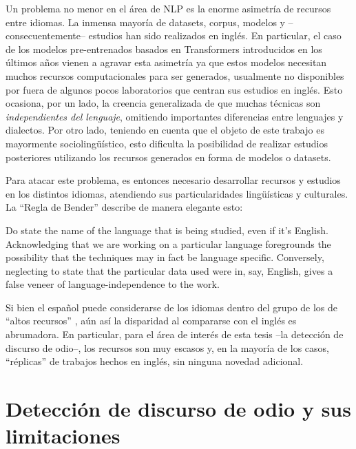 Un problema no menor en el área de NLP es la enorme asimetría de recursos entre idiomas. La inmensa mayoría de datasets, corpus, modelos y --consecuentemente-- estudios han sido realizados en inglés. En particular, el caso de los modelos pre-entrenados basados en Transformers introducidos en los últimos años vienen a agravar esta asimetría ya que estos modelos necesitan muchos recursos computacionales para ser generados, usualmente no disponibles por fuera de algunos pocos laboratorios que centran sus estudios en inglés. Esto ocasiona, por un lado, la creencia generalizada de que muchas técnicas son \emph{independientes del lenguaje}, omitiendo importantes diferencias entre lenguajes y dialectos. Por otro lado, teniendo en cuenta que el objeto de este trabajo es mayormente sociolingüístico, esto dificulta la posibilidad de realizar estudios posteriores utilizando los recursos generados en forma de modelos o datasets.

Para atacar este problema, es entonces necesario desarrollar recursos y estudios en los distintos idiomas, atendiendo sus particularidades lingüísticas y culturales. La ``Regla de Bender'' describe de manera elegante esto:

\begin{displayquote}
    Do state the name of the language that is being studied, even if it's English. Acknowledging that we are working on a particular language foregrounds the possibility that the techniques may in fact be language specific. Conversely, neglecting to state that the particular data used were in, say, English, gives a false veneer of language-independence to the work.
\end{displayquote}

Si bien el español puede considerarse de los idiomas dentro del grupo de los de ``altos recursos'' \cite{bender2019rule}, aún así la disparidad al compararse con el inglés es abrumadora. En particular, para el área de interés de esta tesis --la detección de discurso de odio--, los recursos son muy escasos y, en la mayoría de los casos, ``réplicas'' de trabajos hechos en inglés, sin ninguna novedad adicional.

\section{Detección de discurso de odio y sus limitaciones}

%
%
%
%

